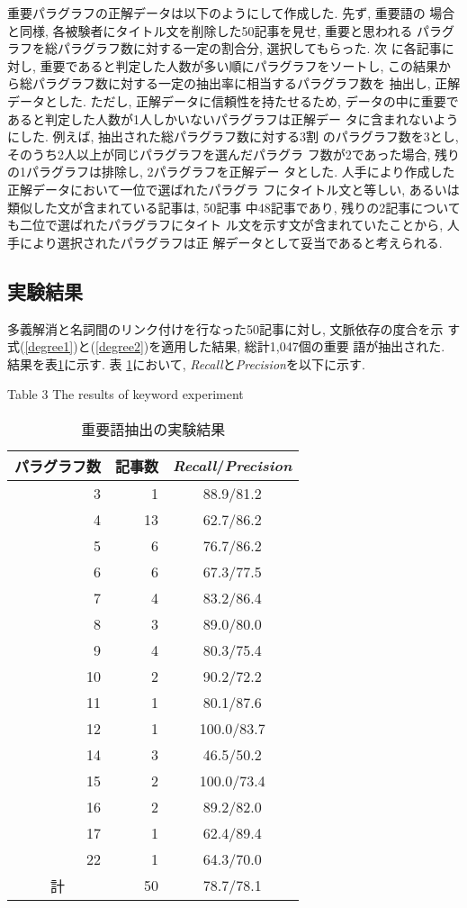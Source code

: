 重要パラグラフの正解データは以下のようにして作成した.  先ず, 重要語の
場合と同様, 各被験者にタイトル文を削除した50記事を見せ, 重要と思われる
パラグラフを総パラグラフ数に対する一定の割合分, 選択してもらった.  次
に各記事に対し, 重要であると判定した人数が多い順にパラグラフをソートし, 
この結果から総パラグラフ数に対する一定の抽出率に相当するパラグラフ数を
抽出し, 正解データとした.  ただし, 正解データに信頼性を持たせるため, 
データの中に重要であると判定した人数が1人しかいないパラグラフは正解デー
タに含まれないようにした.  例えば, 抽出された総パラグラフ数に対する3割
のパラグラフ数を3とし, そのうち2人以上が同じパラグラフを選んだパラグラ
フ数が2であった場合, 残りの1パラグラフは排除し, 2パラグラフを正解デー
タとした.  人手により作成した正解データにおいて一位で選ばれたパラグラ
フにタイトル文と等しい, あるいは類似した文が含まれている記事は, 50記事
中48記事であり, 残りの2記事についても二位で選ばれたパラグラフにタイト
ル文を示す文が含まれていたことから, 人手により選択されたパラグラフは正
解データとして妥当であると考えられる.

\subsection{実験結果}

多義解消と名詞間のリンク付けを行なった50記事に対し, 文脈依存の度合を示
す式(\ref{degree1})と(\ref{degree2})を適用した結果, 総計1,047個の重要
語が抽出された.  結果を表\ref{key_result}に示す.  表
\ref{key_result}において, {\it Recall}と{\it Precision}を以下に示す.

{\footnotesize
\begin{table}[htbp]
\begin{center}
\caption{重要語抽出の実験結果} \label{key_result}
Table 3 The results of keyword experiment \\
\begin{tabular}{r|r|c} \hline \hline
パラグラフ数 &記事数 &{\it Recall}/{\it Precision} \\ \hline \hline
3 &1 &88.9/81.2 \\ \hline
4 &13 &62.7/86.2 \\ \hline
5 &6 &76.7/86.2 \\ \hline
6 &6 &67.3/77.5 \\ \hline
7 &4 &83.2/86.4 \\ \hline
8 &3 &89.0/80.0 \\ \hline
9 &4 &80.3/75.4 \\ \hline
10 &2 &90.2/72.2 \\ \hline
11 &1 &80.1/87.6 \\ \hline
12 &1 &100.0/83.7 \\ \hline
14 &3 &46.5/50.2 \\ \hline
15 &2 &100.0/73.4 \\ \hline
16 &2 &89.2/82.0 \\ \hline
17 &1 &62.4/89.4 \\ \hline
22 &1 &64.3/70.0 \\ \hline \hline
\multicolumn{1}{c|}{計} &50 &78.7/78.1 \\ \hline
\end{tabular}
\end{center}
\end{table}
}

